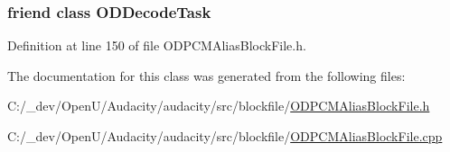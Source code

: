 \subsubsection[{\texorpdfstring{O\+D\+Decode\+Task}{ODDecodeTask}}]{\setlength{\rightskip}{0pt plus 5cm}friend class {\bf O\+D\+Decode\+Task}\hspace{0.3cm}{\ttfamily [friend]}}\hypertarget{class_o_d_p_c_m_alias_block_file_aee4dd21db513d608a0b91918d594fbbe}{}\label{class_o_d_p_c_m_alias_block_file_aee4dd21db513d608a0b91918d594fbbe}


Definition at line 150 of file O\+D\+P\+C\+M\+Alias\+Block\+File.\+h.



The documentation for this class was generated from the following files\+:\begin{DoxyCompactItemize}
\item 
C\+:/\+\_\+dev/\+Open\+U/\+Audacity/audacity/src/blockfile/\hyperlink{_o_d_p_c_m_alias_block_file_8h}{O\+D\+P\+C\+M\+Alias\+Block\+File.\+h}\item 
C\+:/\+\_\+dev/\+Open\+U/\+Audacity/audacity/src/blockfile/\hyperlink{_o_d_p_c_m_alias_block_file_8cpp}{O\+D\+P\+C\+M\+Alias\+Block\+File.\+cpp}\end{DoxyCompactItemize}

